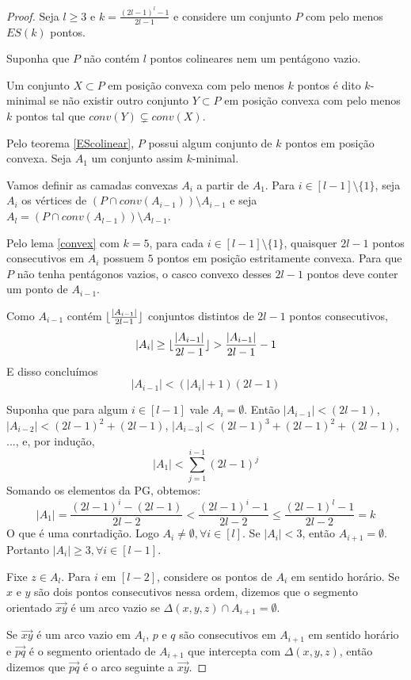 \begin{proof}
    Seja $l\geq 3$ e $k=\frac{(2l-1)^l-1}{2l-1}$ e considere um conjunto $P$ com pelo menos $ES(k)$ pontos.

    Suponha que $P$ não contém $l$ pontos colineares nem um pentágono vazio.

    Um conjunto $X\subset P$ em posição convexa com pelo menos $k$ pontos é dito $k$-minimal se não existir outro conjunto $Y\subset P$ em posição convexa com pelo menos $k$ pontos tal que $conv(Y)\subsetneq conv(X)$.

    Pelo teorema \ref{EScolinear}, $P$ possui algum conjunto de $k$ pontos em posição convexa. Seja $A_1$ um conjunto assim $k$-minimal.

    Vamos definir as camadas convexas $A_i$ a partir de $A_1$.
    Para $i\in[l-1]\setminus\{1\}$, seja $A_i$ os vértices de $(P\cap conv(A_{i-1})) \setminus A_{i-1}$ e seja $A_l=(P\cap conv(A_{l-1}))\setminus A_{l-1}$.

    Pelo lema \ref{convex} com $k=5$, para cada $i\in[l-1]\setminus\{1\}$, quaisquer $2l-1$ pontos consecutivos em $A_i$ possuem $5$ pontos em posição estritamente convexa. Para que $P$ não tenha pentágonos vazios, o casco convexo desses $2l-1$ pontos deve conter um ponto de $A_{i-1}$.

    Como $A_{i-1}$ contém $\lfloor\frac{|A_{i-1}|}{2l-1}\rfloor$ conjuntos distintos de $2l-1$ pontos consecutivos,
    $$|A_i|\geq\lfloor\frac{|A_{i-1}|}{2l-1}\rfloor>\frac{|A_{i-1}|}{2l-1}-1$$
    E disso concluímos
    $$|A_{i-1}|<(|A_i|+1)(2l-1)$$

    Suponha que para algum $i\in[l-1]$ vale $A_i=\emptyset$. Então $|A_{i-1}| < (2l-1)$, $|A_{i-2}| < (2l-1)^2 + (2l-1)$, $|A_{i-3}| < (2l-1)^3 + (2l-1)^2 + (2l-1)$, ..., e, por indução, 
    $$|A_1|<\sum_{j=1}^{i-1}(2l-1)^j$$
    Somando os elementos da PG, obtemos:
    $$|A_1|=\frac{(2l-1)^i-(2l-1)}{2l-2}<\frac{(2l-1)^i-1}{2l-2}\leq\frac{(2l-1)^l-1}{2l-2}=k$$
    O que é uma conrtadição. Logo $A_i\neq\emptyset, \forall i \in [l]$. Se $|A_i| < 3$, então $A_{i+1}=\emptyset$. Portanto $|A_i|\geq 3,\forall i \in [l-1]$.

    Fixe $z\in A_l$. Para $i$ em $[l-2]$, considere os pontos de $A_i$ em sentido horário. Se $x$ e $y$ são dois pontos consecutivos nessa ordem, dizemos que o segmento orientado $\overrightarrow{xy}$ é um arco vazio se $\Delta (x,y,z)\cap A_{i+1}=\emptyset$.

    Se $\overrightarrow{xy}$ é um arco vazio em $A_i$, $p$ e $q$ são consecutivos em $A_{i+1}$ em sentido horário e $\overrightarrow{pq}$ é o segmento orientado de $A_{i+1}$ que intercepta com $\Delta(x,y,z)$, então dizemos que $\overrightarrow{pq}$ é o arco seguinte a $\overrightarrow{xy}$.


\end{proof}
